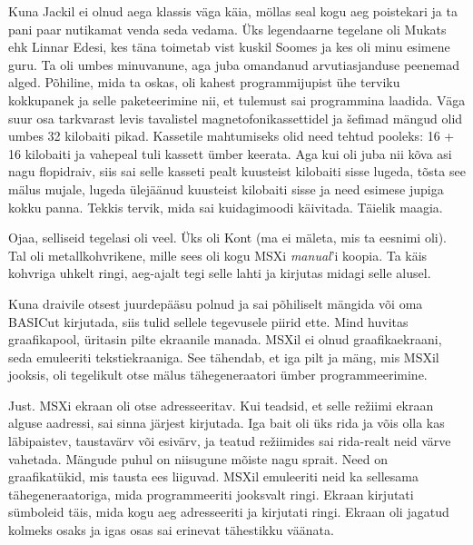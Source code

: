 Kuna Jackil ei olnud aega klassis väga käia,
möllas seal kogu aeg poistekari ja ta pani paar nutikamat venda 
seda vedama. Üks legendaarne tegelane oli 
Mukats ehk Linnar Edesi, kes täna toimetab vist kuskil Soomes ja kes oli minu esimene 
guru. Ta oli umbes minuvanune, aga juba omandanud 
arvutiasjanduse peenemad alged. Põhiline, mida ta oskas, oli kahest 
programmijupist ühe terviku kokkupanek ja selle paketeerimine nii, et 
tulemust sai programmina laadida.
Väga suur osa tarkvarast levis tavalistel magnetofonikassettidel ja 
šefimad mängud olid umbes 32 kilobaiti pikad. 
Kassetile mahtumiseks olid need tehtud pooleks: 16 + 16 
kilobaiti ja vahepeal tuli kassett ümber keerata. Aga kui oli juba nii kõva asi 
nagu 
flopidraiv, siis sai selle kasseti pealt kuusteist kilobaiti sisse lugeda, 
tõsta 
see mälus mujale, lugeda ülejäänud kuusteist kilobaiti sisse ja need esimese 
jupiga 
kokku panna. Tekkis tervik, mida sai kuidagimoodi käivitada. 
Täielik maagia. 


Ojaa, selliseid tegelasi oli veel. Üks oli 
Kont (ma ei mäleta, mis ta eesnimi oli). Tal oli 
metallkohvrikene, mille sees oli kogu MSXi \emph{manual}'i koopia. Ta käis 
kohvriga uhkelt ringi, aeg-ajalt tegi 
selle lahti ja kirjutas midagi selle alusel.

Kuna draivile otsest juurdepääsu polnud ja sai põhiliselt 
mängida või oma BASICut kirjutada, siis tulid sellele 
tegevusele piirid ette. Mind huvitas graafikapool, 
üritasin pilte ekraanile manada. MSXil ei olnud 
graafikaekraani, seda emuleeriti tekstiekraaniga. See tähendab, et
iga pilt ja mäng, mis MSXil jooksis, oli 
tegelikult otse mälus tähegeneraatori ümber programmeerimine. 


Just. MSXi ekraan oli otse adresseeritav. Kui 
teadsid, et selle režiimi ekraan alguse aadressi, sai sinna järjest kirjutada. 
Iga bait 
oli üks rida ja võis olla kas läbipaistev, taustavärv või esivärv, ja teatud
režiimides sai rida-realt neid värve vahetada. 
Mängude puhul on niisugune mõiste nagu sprait. Need on graafikatükid, mis 
tausta ees liiguvad. MSXil 
emuleeriti neid ka sellesama tähegeneraatoriga, mida programmeeriti jooksvalt 
ringi. 
Ekraan kirjutati sümboleid täis, mida kogu aeg adresseeriti ja 
kirjutati ringi. Ekraan oli jagatud kolmeks osaks ja igas osas sai erinevat 
tähestikku väänata.

